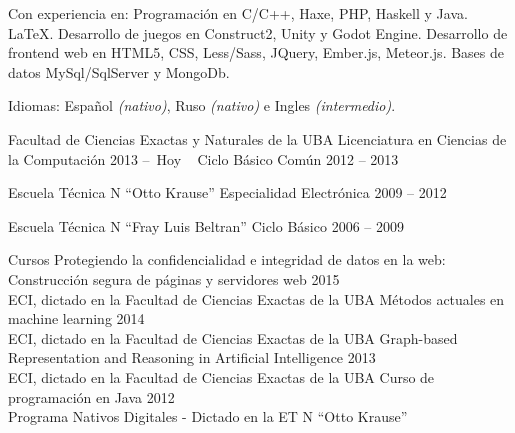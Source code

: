 \documentclass[10pt,a4paper]{article}
\begin{document}
\inlineheadsection  %
  {Con experiencia en:}
  {Programación en C/C++, Haxe, PHP, Haskell y Java. \LaTeX. Desarrollo de juegos en Construct2, Unity y Godot Engine. Desarrollo de frontend web en HTML5, CSS, Less/Sass, JQuery, Ember.js, Meteor.js. Bases de datos MySql/SqlServer y MongoDb.}

  \vspace{0.5em}
\inlineheadsection
  {Idiomas:}
  {Español \emph{(nativo)}, Ruso \emph{(nativo)} e Ingles \emph{(intermedio)}.}


\spacedhrule{1.9em}{-0.4em}


\vspace{0.2em}
\headedsection
  {Facultad de Ciencias Exactas y Naturales de la UBA}
  {\textsc{}} {%
  \headedsubsection
    {Licenciatura en Ciencias de la Computación}
    {2013 --\  Hoy \ }{}
  \headedsubsection
    {Ciclo Básico Común}
    {2012 -- 2013}{}
}

\vspace{0.2em}
\headedsection
  {Escuela Técnica N ``Otto Krause''}
  {\textsc{}} {%
  \headedsubsection
    {Especialidad Electrónica}
    {2009 -- 2012} {}
}

\vspace{0.2em}
\headedsection
  {Escuela Técnica N ``Fray Luis Beltran''}
  {\textsc{}} {%
  \headedsubsection
    {Ciclo Básico}
    {2006 -- 2009} {}
}

\vspace{0.2em}
\headedsection
  {Cursos}
  {\textsc{}} {%
  \headedsubsection
    {Protegiendo la confidencialidad e integridad de datos en la web:\\
    \indent Construcción segura de páginas y servidores web}
    {2015}{\\
    ECI, dictado en la Facultad de Ciencias Exactas de la UBA}
  \headedsubsection
    {Métodos actuales en machine learning}
    {2014}{\\
    ECI, dictado en la Facultad de Ciencias Exactas de la UBA}
  \headedsubsection
    {Graph-based Representation and Reasoning in Artificial Intelligence}
    {2013}{\\
    ECI, dictado en la Facultad de Ciencias Exactas de la UBA}
  \headedsubsection
    {Curso de programación en Java}
    {2012}{\\
    Programa Nativos Digitales - Dictado en la ET N ``Otto Krause''}
}
\end{document}
